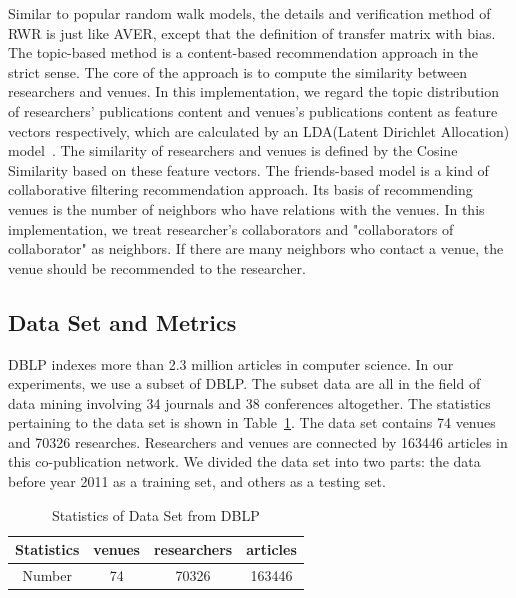 \documentclass[9pt]{acm_proc_article-sp}
\begin{document}
Similar to popular random walk models, the details and verification method of RWR is just like AVER, except that the definition of transfer matrix with bias. The topic-based method is a content-based recommendation approach in the strict sense. The core of the approach is to compute the similarity between researchers and venues. In this implementation, we regard the topic distribution of researchers' publications content and venues's publications content as feature vectors respectively, which are calculated by an LDA(Latent Dirichlet Allocation) model~\cite{blei2003latent}. The similarity of researchers and venues is defined by the Cosine Similarity based on these feature vectors. The friends-based model is a kind of collaborative filtering recommendation approach. Its basis of recommending venues is the number of neighbors who have relations with the venues. In this implementation, we treat researcher's collaborators and "collaborators of collaborator" as neighbors. If there are many neighbors who contact a venue, the venue should be recommended to the researcher.

\subsection{Data Set and Metrics}
DBLP indexes more than 2.3 million articles in computer science. In our experiments, we use a subset of DBLP. The subset data are all in the field of data mining involving 34 journals and 38 conferences altogether. The statistics pertaining to the data set is shown in Table~\ref{table1}. The data set contains 74 venues and 70326 researches. Researchers and venues are connected by 163446 articles in this co-publication network. We divided the data set into two parts: the data before year 2011 as a training set, and others as a testing set.
\begin{table}
\renewcommand{\arraystretch}{1.2}
\centering
\caption{Statistics of Data Set from DBLP}
\label{table1}
\begin{tabular}{|c|c|c|c|} \hline
Statistics &venues&researchers&articles\\ \hline
Number & 74 & 70326 &163446 \\
\hline\end{tabular}
\end{table}
\end{document}
